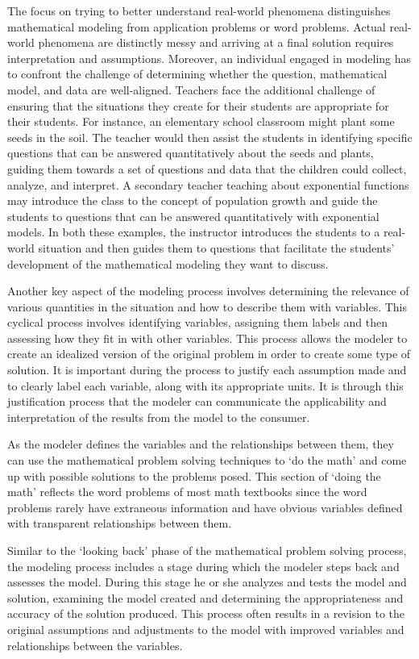 \documentclass[
]{book}
\theoremstyle{definition}
\theoremstyle{definition}
\theoremstyle{definition}
\theoremstyle{definition}
\theoremstyle{remark}
\begin{document}
The focus on trying to better understand real-world phenomena distinguishes mathematical modeling from application problems or word problems. Actual real-world phenomena are distinctly messy and arriving at a final solution requires interpretation and assumptions. Moreover, an individual engaged in modeling has to confront the challenge of determining whether the question, mathematical model, and data are well-aligned. Teachers face the additional challenge of ensuring that the situations they create for their students are appropriate for their students. For instance, an elementary school classroom might plant some seeds in the soil. The teacher would then assist the students in identifying specific questions that can be answered quantitatively about the seeds and plants, guiding them towards a set of questions and data that the children could collect, analyze, and interpret. A secondary teacher teaching about exponential functions may introduce the class to the concept of population growth and guide the students to questions that can be answered quantitatively with exponential models. In both these examples, the instructor introduces the students to a real-world situation and then guides them to questions that facilitate the students' development of the mathematical modeling they want to discuss.

Another key aspect of the modeling process involves determining the relevance of various quantities in the situation and how to describe them with variables. This cyclical process involves identifying variables, assigning them labels and then assessing how they fit in with other variables. This process allows the modeler to create an idealized version of the original problem in order to create some type of solution. It is important during the process to justify each assumption made and to clearly label each variable, along with its appropriate units. It is through this justification process that the modeler can communicate the applicability and interpretation of the results from the model to the consumer.

As the modeler defines the variables and the relationships between them, they can use the mathematical problem solving techniques to `do the math' and come up with possible solutions to the problems posed. This section of `doing the math' reflects the word problems of most math textbooks since the word problems rarely have extraneous information and have obvious variables defined with transparent relationships between them.

Similar to the `looking back' phase of the mathematical problem solving process, the modeling process includes a stage during which the modeler steps back and assesses the model. During this stage he or she analyzes and tests the model and solution, examining the model created and determining the appropriateness and accuracy of the solution produced. This process often results in a revision to the original assumptions and adjustments to the model with improved variables and relationships between the variables.
\end{document}
